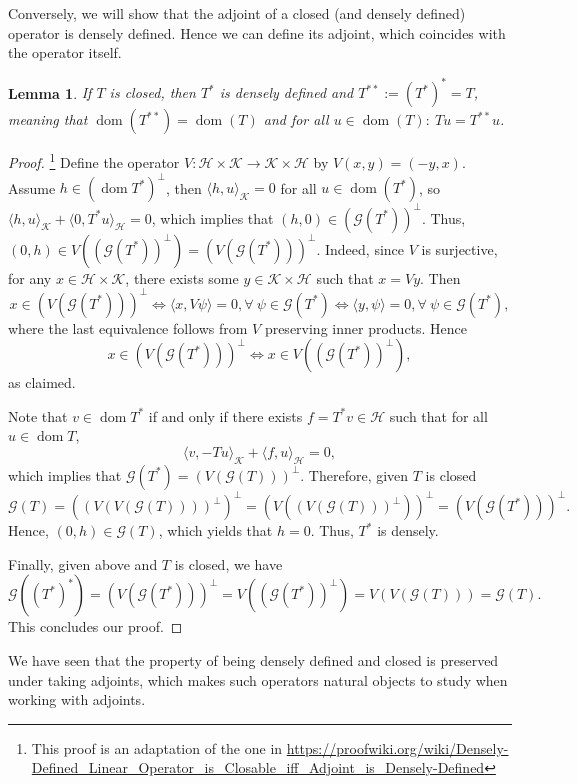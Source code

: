 \documentclass[11pt]{article}
\newtheorem{lemma}[theorem]{Lemma}
\theoremstyle{definition}
\theoremstyle{remark}
\DeclareMathOperator\dom{dom}
\begin{document}
Conversely, we will show that the adjoint of a closed (and densely defined) operator is densely defined. Hence we can define its adjoint, which coincides with the operator itself.
\begin{lemma}\label{T^**=T}
    If $T$ is closed, then $T^*$ is densely defined and $T^{**}:=(T^*)^*=T$, meaning that $\dom(T^{**})=\dom(T)$ and for all $u \in \dom(T): \ Tu=T^{**}u$.
\end{lemma}
\begin{proof} \hspace{-0.2cm}\footnote{This proof is an adaptation of the one in \url{https://proofwiki.org/wiki/Densely-Defined_Linear_Operator_is_Closable_iff_Adjoint_is_Densely-Defined}}
    Define the operator $V:\mathcal{H}\times\mathcal{K}\to\mathcal{K}\times\mathcal{H}$ by $V(x,y)=(-y,x)$. Assume $h\in (\dom T^*)^\perp$, then $\langle h,u\rangle_\mathcal{K}=0$ for all $u\in\dom (T^*)$, so $\langle h,u\rangle_\mathcal{K}+\langle 0,T^*u\rangle_\mathcal{H}=0$, which implies that $(h,0)\in(\mathcal{G}(T^*))^\perp.$ Thus, $(0,h)\in V((\mathcal{G}(T^*))^\perp)=(V(\mathcal{G}(T^*)))^\perp$. Indeed, since $V$ is surjective, for any $x\in \mathcal{H}\times \mathcal{K}$, there exists some $y\in \mathcal{K}\times \mathcal{H}$ such that $x=Vy$. Then
    $$
    x\in(V(\mathcal{G}(T^*)))^\perp\Leftrightarrow \langle x,V\psi\rangle=0, \forall\ \psi\in \mathcal{G}(T^*)\Leftrightarrow \langle y,\psi\rangle=0,\forall\ \psi\in\mathcal{G}(T^*),
    $$
    where the last equivalence follows from $V$ preserving inner products. Hence
    $$
    x\in(V(\mathcal{G}(T^*)))^\perp\Leftrightarrow x\in V((\mathcal{G}(T^*))^\perp),
    $$
    as claimed.

    Note that $v\in \dom T^*$ if and only if there exists $f=T^*v \in \mathcal{H}$ such that for all $u\in \dom T$,
    $$\langle v,-Tu\rangle_\mathcal{K}+\langle f,u\rangle_\mathcal{H}=0,$$
    which implies that $\mathcal{G}(T^*) = (V(\mathcal{G}(T)))^\perp$. Therefore, given $T$ is closed
    $$
    \mathcal{G}(T)=((V(V(\mathcal{G}(T))))^\perp)^\perp=(V((V(\mathcal{G}(T)))^\perp))^\perp= (V(\mathcal{G}(T^*)))^\perp.
    $$
    Hence, $(0,h)\in \mathcal{G}(T)$, which yields that $h=0$. Thus, $T^*$ is densely.
    
    Finally, given above and $T$ is closed, we have
    $$
    \mathcal{G}((T^*)^*)=(V(\mathcal{G}(T^*)))^\perp=V((\mathcal{G}(T^*))^\perp)=V(V(\mathcal{G}(T)))=\mathcal{G}(T).
    $$
    This concludes our proof.
\end{proof}

We have seen that the property of being densely defined and closed is preserved under taking adjoints, which makes such operators natural objects to study when working with adjoints.
\end{document}
